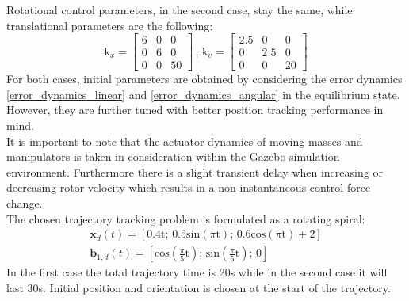 \noindent Rotational control parameters, in the second case, stay the same, while translational parameters are the following: 
\begin{equation*}
	\text{k}_x = 
	\begin{bmatrix}
		6 &  0  &  0 \\
		0 & 6  &	0 \\ 
		0 &  0  & 50 	
	\end{bmatrix}
	\, , \,	
	\text{k}_v =
	\begin{bmatrix}
		2.5 & 0 & 0 \\
		0 & 2.5 & 0 \\
		0 & 0 & 20
	\end{bmatrix}
\end{equation*}
For both cases, initial parameters are obtained by considering the error dynamics \eqref{error_dynamics_linear} and \eqref{error_dynamics_angular} in the equilibrium state. However, they are further tuned with better position tracking performance in mind.\\
It is important to note that the actuator dynamics of moving masses and manipulators is taken in consideration within the Gazebo simulation environment. Furthermore there is a slight transient delay when increasing or decreasing rotor velocity which results in a non-instantaneous control force change. \\
\indent The chosen trajectory tracking problem is formulated as a rotating spiral:
\begin{gather*}
	\textbf{x}_d(t) = [0.4\text{t}; \, 0.5\text{sin}(\pi\text{t}); \, 0.6\text{cos}(\pi\text{t}) + 2] \\
	\textbf{b}_{1,d}(t) = [\text{cos}\left(\frac{\pi}{5}\text{t}\right); \, \text{sin}\left(\frac{\pi}{5}\text{t}\right); \, 0]
\end{gather*}
\noindent In the first case the total trajectory time is 20s while in the second case it will last 30s. Initial position and orientation is chosen at the start of the trajectory. \\
